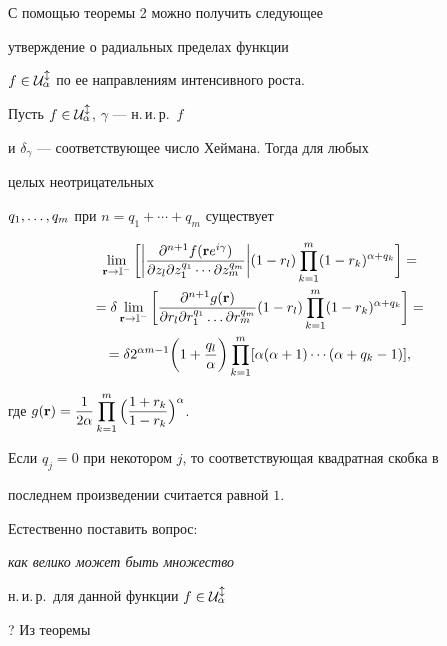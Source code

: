 С помощью теоремы 2 можно получить следующее


утверждение о радиальных пределах функции


$f\in\cal U_\alpha^l$ по ее направлениям интенсивного роста.





\begin{thm}


Пусть $f\in\cal U^l_\alpha$, $\gamma$ --- н.\,и.\,р.~$f$


и $\delta_{\gamma}$ --- соответствующее число Хеймана. Тогда для любых


целых неотрицательных


$q_1,\dotsc,q_m$ при $n=q_1+\dotsb+q_m$ существует


\begin{multline*}


\lim_{\bold r\to\Bbb I^-}\bigg[\bigg|\frac{\partial^{n+1}f(\bold r


e^{i\gamma})}{\partial z_l\partial


z_1^{q_1}\dotsb \partial


z_m^{q_m}}\bigg|(1-r_l)\prod_{k=1}^m(1-r_k)^{\alpha+q_k}\bigg]=\\


%


=\delta\lim_{\bold r\to\Bbb I^-}\bigg[\frac{\partial^{n+1}g(\bold r)}


{\partial r_l\partial r_1^{q_1}\cd\partial r_m^{q_m}}(1-r_l)\prod_{k=1}^m


(1-r_k)^{\alpha+q_k}\bigg]=\\


%


=\delta 2^{\alpha m-1}\bigg(1+\frac{q_l}\alpha\bigg)


\prod_{k=1}^m[\alpha(\alpha+1)\dotsb(\alpha+q_k-1)],


\end{multline*}


где $g(\bold r)=\displaystyle \frac 1{2\alpha}


\prod_{k=1}^m\Big(\frac{1+r_k}{1-r_k}\Big)^\alpha$.


Если $q_j=0$ при некотором $j$, то соответствующая квадратная скобка в


последнем произведении считается равной $1$.


\end{thm}





Естественно поставить вопрос: {\it как велико может быть множество


н.\,и.\,р.~для данной функции $f\in\cal U^l_\alpha$}? Из теоремы



